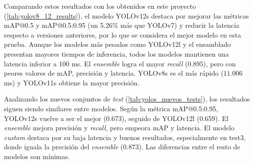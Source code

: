 \documentclass[12pt,a4paper,onecolumn,oneside]{report}
\begin{document}
\begin{table}[H]
  \caption{Resultados de los modelos sobre el conjunto de \textit{test} original}
  \centering
  \label{tab:yolov8_12_results}
\end{table}

Comparando estos resultados con los obtenidos en este proyecto (\autoref{tab:yolov8_12_results}), el modelo YOLOv12s destaca por mejorar las métricas mAP@0.5 y mAP@0.5:0.95 (un 5.26\% más que YOLOv7) y 
reducir la latencia respecto a versiones anteriores, por lo que se considera el mejor modelo en esta prueba. Aunque los modelos más pesados como YOLOv12l y el ensamblado 
presentan mayores tiempos de inferencia, todos los modelos mantienen una latencia inferior a 100 ms. El \textit{ensemble} logra el mayor \textit{recall} ($0.895$), pero con peores valores de mAP, 
precisión y latencia. YOLOv8s es el más rápido ($11.006$ ms) y YOLOv11s obtiene la mayor precisión.

Analizando los nuevos conjuntos de \textit{test} (\autoref{tab:yolos_nuevos_tests}), los resultados siguen siendo similares entre modelos. Según la métrica mAP@0.5:0.95, YOLOv12s vuelve a ser el mejor (0.673), seguido de YOLOv12l (0.659). 
El \textit{ensemble} mejora precisión y \textit{recall}, pero empeora mAP y latencia. El modelo \textit{custom} destaca por su baja latencia y buenos resultados, especialmente en test3, 
donde iguala la precisión del \textit{ensemble} ($0.873$). Las diferencias entre el resto de modelos son mínimas.
\end{document}
